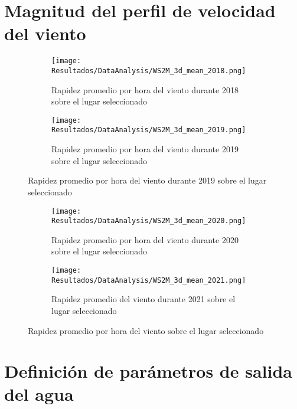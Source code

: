 		\section{Magnitud del perfil de velocidad del viento}
			
			\begin{figure}[H]
				\centering
				\begin{subfigure}[t]{0.45\linewidth}
					\centering
					\texttt{[image: Resultados/DataAnalysis/WS2M\_3d\_mean\_2018.png]}
					\caption{Rapidez promedio por hora del viento durante 2018 sobre el lugar seleccionado}
					\label{fig:WS2M_3d_mean_2018}
				\end{subfigure}
				\hfill
				\begin{subfigure}[t]{0.45\linewidth}
					\centering
					\texttt{[image: Resultados/DataAnalysis/WS2M\_3d\_mean\_2019.png]}
					\caption{Rapidez promedio por hora del viento durante 2019 sobre el lugar seleccionado}
					\label{fig:WS2M_3d_mean_2019}
				\end{subfigure}
			\end{figure}
			
			\begin{figure}[H]\ContinuedFloat
				\begin{subfigure}[t]{0.45\linewidth}
					\centering
					\texttt{[image: Resultados/DataAnalysis/WS2M\_3d\_mean\_2020.png]}
					\caption{Rapidez promedio por hora del viento durante 2020 sobre el lugar seleccionado}
					\label{fig:WS2M_3d_mean_2020}
				\end{subfigure}
				\hfill
				\begin{subfigure}[t]{0.45\linewidth}
					\centering
					\texttt{[image: Resultados/DataAnalysis/WS2M\_3d\_mean\_2021.png]}
					\caption{Rapidez promedio del viento durante 2021 sobre el lugar seleccionado}
					\label{fig:WS2M_3d_mean_2021}
				\end{subfigure}
				\caption{Rapidez promedio por hora del viento sobre el lugar seleccionado}
				\label{fig:WS2M_3d_mean}
			\end{figure}
	
	\section{Definición de parámetros de salida del agua}
		
